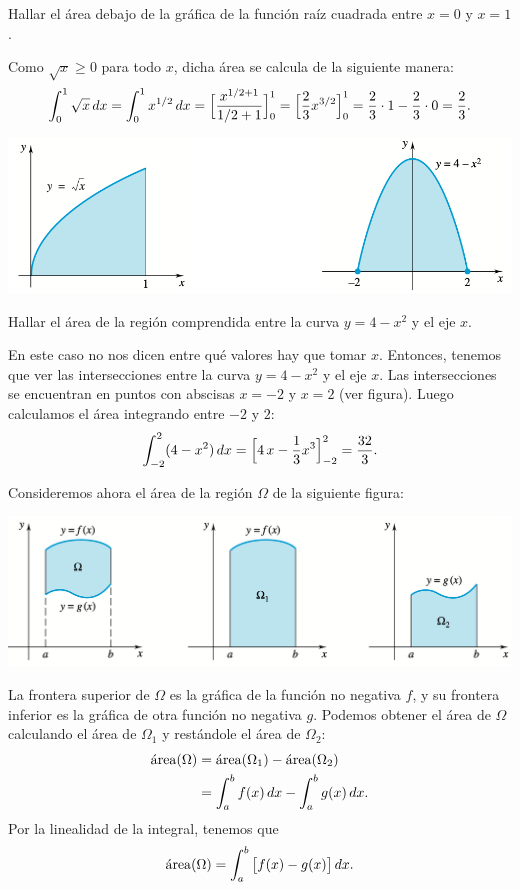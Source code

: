 \begin{example}
  Hallar el área debajo de la gráfica de la función raíz cuadrada entre $x=0$ y $x=1$.

  Como $\sqrt{x}\ge0$ para todo $x$, dicha área se calcula de la siguiente manera:
  \[
  \int_0^1 \sqrt{x}\,dx = \int_0^1 x^{1/2}\,dx 
  = \Big[ \frac{x^{1/2+1}}{1/2+1} \Big]_0^1
  = \Big[ \frac23x^{3/2} \Big]_0^1
  = \frac23 \cdot 1 - \frac23 \cdot 0 = \frac23.
  \]
\end{example}

\centerline{\includegraphics[width=.9\textwidth]{pics/areas-1.png}}

\begin{example}
  Hallar el área de la región comprendida entre la curva $y=4-x^2$ y el eje $x$.

  En este caso no nos dicen entre qué valores hay que tomar $x$. Entonces, tenemos que ver las intersecciones entre la curva $y=4-x^2$ y el eje $x$. Las intersecciones se encuentran en puntos con abscisas $x=-2$ y $x=2$ (ver figura).
  Luego calculamos el área integrando entre $-2$ y $2$:
  \[
  \int_{-2}^2 (4-x^2)\,dx = \Big[ 4\, x-\frac13 x^3 \Big]_{-2}^2
  = \frac{32}3.
  \]
\end{example}

Consideremos ahora el área de la región $\Omega$ de la siguiente figura:

\centerline{\includegraphics[width=.9\textwidth]{pics/areas-2.png}}

La frontera superior de $\Omega$ es la gráfica de la función no negativa $f$, y su frontera inferior es la gráfica de otra función no negativa $g$. Podemos obtener el área de $\Omega$ calculando el área de $\Omega_1$ y restándole el área de $\Omega_2$:
\begin{align*}
  \mathrm{\protect\acute{a}rea}(\Omega)&=\mathrm{\protect\acute{a}rea}(\Omega_1)-\mathrm{\protect\acute{a}rea}(\Omega_2)\\
  &= \int_a^b f(x)\,dx - \int_a^b g(x)\,dx.
\end{align*}
Por la linealidad de la integral, tenemos que
\begin{equation}\label{eq:area entre dos curvas}
  \mathrm{\protect\acute{a}rea}(\Omega) = \int_a^b \big[f(x)-g(x)\big]\,dx.
\end{equation}

